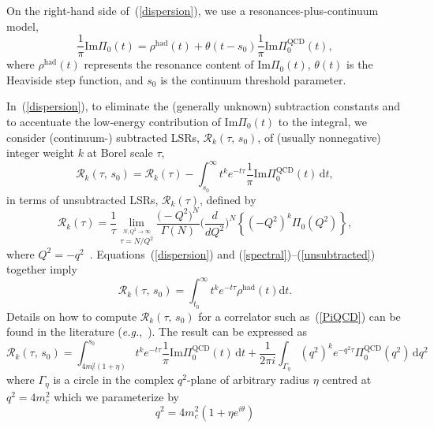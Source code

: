 \documentclass[12pt, letterpaper]{article}
\renewcommand{\Im}{\mathrm{Im}}
\newcommand{\dt}{\mathrm{d}t}
\newcommand{\dqsq}{\mathrm{d}q^2}
\newcommand{\lsr}{\mathcal{R}}
\newcommand{\eg}{\textit{e.g.}}
\begin{document}
On the right-hand side of~(\ref{dispersion}), we use a resonances-plus-continuum 
model,
\begin{equation}\label{spectral}
  \frac{1}{\pi}\Im\Pi_0(t) = \rho^{\text{had}}(t) + \theta(t-s_0)\frac{1}{\pi}\Im\Pi^{\text{QCD}}_0(t),
\end{equation}
where $\rho^{\text{had}}(t)$ represents the resonance content of $\Im\Pi_0(t)$,
$\theta(t)$ is the Heaviside step function, and $s_0$ is the continuum 
threshold parameter.

In~(\ref{dispersion}), to eliminate the (generally unknown) subtraction constants
and to accentuate the low-energy contribution of $\Im\Pi_0(t)$ to the integral,
we consider (continuum-) subtracted LSRs, $\lsr_k(\tau,\,s_0)$,
of (usually nonnegative) integer weight $k$ at Borel scale $\tau$,
\begin{equation}\label{subtracted}
  \lsr_k(\tau,\,s_0) = \lsr_k(\tau) 
  - \int_{s_0}^{\infty}\! t^k e^{-t\tau} \frac{1}{\pi}\Im\Pi_0^{\text{QCD}}(t)\,\dt,
\end{equation}
in terms of unsubtracted LSRs, $\lsr_{k}(\tau)$, defined by 
\begin{equation}\label{unsubtracted}
  \lsr_k(\tau) = \frac{1}{\tau}
  \lim_{\stackrel{N,Q^2\rightarrow\infty}{\tau=N/Q^2}}
  \frac{\big(-Q^2\big)^N}{\Gamma(N)}\bigg(\frac{d}{dQ^2}\bigg)^N
  \left\{(-Q^2)^k \Pi_0(Q^2)\right\},
\end{equation}
where $Q^2=-q^2$~\cite{Shifman:1978by,Shifman:1978bx,Reinders:1984sr}.
Equations~(\ref{dispersion}) and (\ref{spectral})--(\ref{unsubtracted}) 
together imply 
\begin{equation}\label{LSRduality}
  \lsr_k(\tau,\,s_0) = \int_{t_0}^{\infty}\! t^k e^{-t\tau} 
  \rho^{\text{had}}(t)\dt.
\end{equation}
Details on how to compute $\lsr_k(\tau,\,s_0)$ for a correlator such as~(\ref{PiQCD})
can be found in the literature
(\eg,~\cite{Shifman:1978by,Govaerts:1985fx,Berg:2012gd}).
The result can be expressed as
\begin{equation}\label{lsrFinal}
  \lsr_k(\tau,\,s_0) = \int_{4m_c^2(1+\eta)}^{s_0}\! t^k e^{-t\tau} 
    \frac{1}{\pi}\Im\Pi_0^{\text{QCD}}(t)\,\dt
  + \frac{1}{2\pi i}\int_{\Gamma_\eta}\! \left(q^2\right)^k 
  e^{-q^2\tau} \Pi_0^{\text{QCD}}(q^2)\,\dqsq
\end{equation}
where $\Gamma_\eta$ is a circle in the complex $q^2$-plane 
of arbitrary radius $\eta$ centred at $q^2=4m_c^2$ which we parameterize by
\begin{equation}
  q^2 = 4m_c^2\left( 1 + \eta e^{i\theta}\right)
\end{equation}
\end{document}
